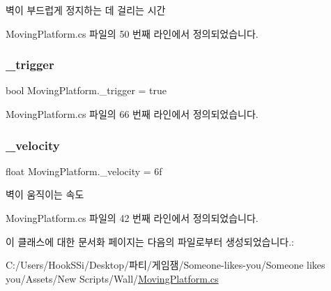 벽이 부드럽게 정지하는 데 걸리는 시간 



Moving\+Platform.\+cs 파일의 50 번째 라인에서 정의되었습니다.

\mbox{\label{class_moving_platform_a98e69f4b8bfe702ef2bc6a8d77a03b8a}} 
\subsubsection{\texorpdfstring{\_trigger}{\_trigger}}
{\footnotesize\ttfamily bool Moving\+Platform.\+\_\+trigger = true\hspace{0.3cm}{\ttfamily [private]}}



Moving\+Platform.\+cs 파일의 66 번째 라인에서 정의되었습니다.

\mbox{\label{class_moving_platform_a831cd24df75aa37f0897741d189686a7}} 
\subsubsection{\texorpdfstring{\_velocity}{\_velocity}}
{\footnotesize\ttfamily float Moving\+Platform.\+\_\+velocity = 6f}



벽이 움직이는 속도 



Moving\+Platform.\+cs 파일의 42 번째 라인에서 정의되었습니다.



이 클래스에 대한 문서화 페이지는 다음의 파일로부터 생성되었습니다.\+:\begin{DoxyCompactItemize}
\item 
C\+:/\+Users/\+Hook\+S\+Si/\+Desktop/파티/게임잼/\+Someone-\/likes-\/you/\+Someone likes you/\+Assets/\+New Scripts/\+Wall/\mbox{\hyperlink{_moving_platform_8cs}{Moving\+Platform.\+cs}}\end{DoxyCompactItemize}
